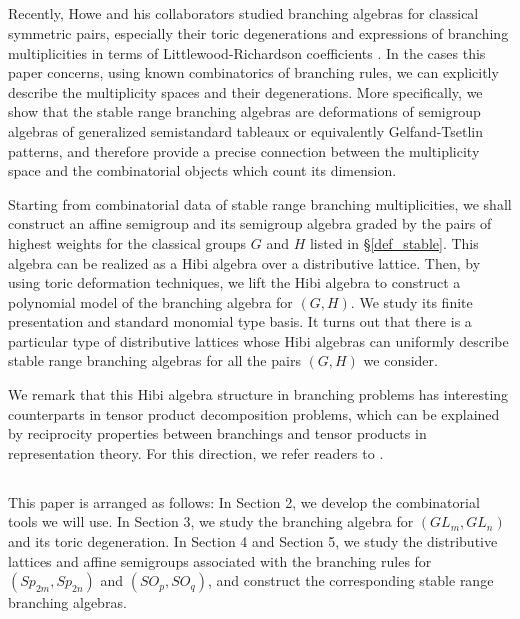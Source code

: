 \documentclass[11pt]{amsart}
\numberwithin{equation}{subsection}
\begin{document}
\subsection{}

Recently, Howe and his collaborators studied branching algebras for classical 
symmetric pairs, especially their toric degenerations and expressions of branching 
multiplicities in terms of Littlewood-Richardson coefficients \cite{HJLTW, HTW}.
In the cases this paper concerns, using known combinatorics of branching rules, 
we can explicitly describe the multiplicity spaces and their degenerations.
More specifically, we show that the stable range branching algebras are deformations 
of semigroup algebras of generalized semistandard tableaux or equivalently Gelfand-Tsetlin
patterns, and therefore provide a precise connection between the multiplicity 
space and the combinatorial objects which count its dimension.

Starting from combinatorial data of stable range branching
multiplicities, we shall construct an affine semigroup and its semigroup algebra
graded by the pairs of highest weights for the classical groups $G$ and $H$ listed in 
\S \ref{def_stable}. This algebra can be realized as a Hibi algebra over a distributive lattice. 
Then, by using toric deformation techniques, we lift the Hibi algebra to construct 
a polynomial model of the branching algebra for $(G,H)$. We study its finite 
presentation and standard monomial type basis. 
It turns out that there is a particular type of distributive lattices 
whose Hibi algebras can uniformly describe stable range branching algebras 
for all the pairs $(G,H)$ we consider. 

\smallskip

We remark that this Hibi algebra structure in branching problems has 
interesting counterparts in tensor product decomposition problems, which 
can be explained by reciprocity properties between 
branchings and tensor products in representation theory. 
For this direction, we refer readers to \cite{HL07, HKL, KL}.


\subsection{}

This paper is arranged as follows: In Section 2, we develop the
combinatorial tools we will use. In Section 3, we study the branching
algebra for $({GL}_{m},{GL}_{n})$ and its toric degeneration. In Section
4 and Section 5, we study the distributive lattices and affine semigroups
associated with the branching rules for $({Sp}_{2m},{Sp}_{2n})$ and $({SO}_{p},{SO}_{q})$, 
and construct the corresponding stable range branching algebras.
\end{document}
